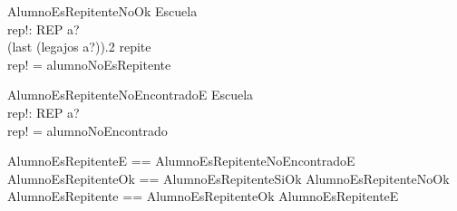 \documentclass{article}
\begin{document}
  \begin{schema}{AlumnoEsRepitenteNoOk}
    \Xi Escuela \\
    rep!: REP
    \where
    a? \in {} \\
    (last \; (legajos \; a?)).2 \neq repite \\
    rep! = alumnoNoEsRepitente
  \end{schema}

  \begin{schema}{AlumnoEsRepitenteNoEncontradoE}
    \Xi Escuela \\
    rep!: REP
    \where
    a? \notin {} \\
    rep! = alumnoNoEncontrado
  \end{schema}

  \begin{zed}
    AlumnoEsRepitenteE == AlumnoEsRepitenteNoEncontradoE \\
    AlumnoEsRepitenteOk == AlumnoEsRepitenteSiOk \lor AlumnoEsRepitenteNoOk \\
    AlumnoEsRepitente == AlumnoEsRepitenteOk \lor AlumnoEsRepitenteE \\
  \end{zed}
\end{document}

